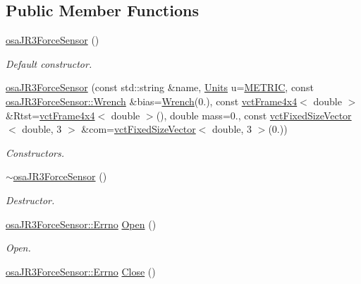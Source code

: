 \subsection*{Public Member Functions}
\begin{DoxyCompactItemize}
\item 
\hyperlink{classosa_j_r3_force_sensor_adc56ae890dde03da65343e7b8618b75b}{osa\-J\-R3\-Force\-Sensor} ()
\begin{DoxyCompactList}\small\item\em Default constructor. \end{DoxyCompactList}\item 
\hyperlink{classosa_j_r3_force_sensor_ad076a77e94576d3946147709a0d2b28f}{osa\-J\-R3\-Force\-Sensor} (const std\-::string \&name, \hyperlink{classosa_j_r3_force_sensor_ac94f1969d4d2089487b912dd0ef7592f}{Units} u=\hyperlink{classosa_j_r3_force_sensor_ac94f1969d4d2089487b912dd0ef7592faf9d1cb83e02904b93520796fff2d9161}{M\-E\-T\-R\-I\-C}, const \hyperlink{classosa_j_r3_force_sensor_afcfc2ba175b2e7ef9f86c6394c8966d2}{osa\-J\-R3\-Force\-Sensor\-::\-Wrench} \&bias=\hyperlink{classosa_j_r3_force_sensor_afcfc2ba175b2e7ef9f86c6394c8966d2}{Wrench}(0.), const \hyperlink{classvct_frame4x4}{vct\-Frame4x4}$<$ double $>$ \&Rtst=\hyperlink{classvct_frame4x4}{vct\-Frame4x4}$<$ double $>$(), double mass=0., const \hyperlink{classvct_fixed_size_vector}{vct\-Fixed\-Size\-Vector}$<$ double, 3 $>$ \&com=\hyperlink{classvct_fixed_size_vector}{vct\-Fixed\-Size\-Vector}$<$ double, 3 $>$(0.))
\begin{DoxyCompactList}\small\item\em Constructors. \end{DoxyCompactList}\item 
\hyperlink{classosa_j_r3_force_sensor_abf994dcb084fab254ebe1bd5e90660dc}{$\sim$osa\-J\-R3\-Force\-Sensor} ()
\begin{DoxyCompactList}\small\item\em Destructor. \end{DoxyCompactList}\item 
\hyperlink{classosa_j_r3_force_sensor_a6b27d3a601fae1547fb13d2a4ef97e4a}{osa\-J\-R3\-Force\-Sensor\-::\-Errno} \hyperlink{classosa_j_r3_force_sensor_a87d5fcf202b615b380fc2ca07377b447}{Open} ()
\begin{DoxyCompactList}\small\item\em Open. \end{DoxyCompactList}\item 
\hyperlink{classosa_j_r3_force_sensor_a6b27d3a601fae1547fb13d2a4ef97e4a}{osa\-J\-R3\-Force\-Sensor\-::\-Errno} \hyperlink{classosa_j_r3_force_sensor_a90e05e652d0cff51df2d065b28eb4d70}{Close} ()

\end{DoxyCompactItemize}
